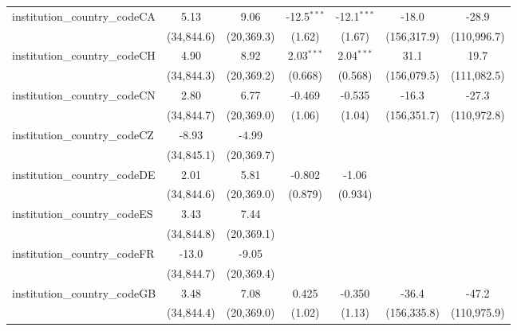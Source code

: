 \begin{tabular}{lcccccc}
   institution\_country\_codeCA          & 5.13         & 9.06         & -12.5$^{***}$ & -12.1$^{***}$ & -18.0       & -28.9\\   
                                         & (34,844.6)   & (20,369.3)   & (1.62)        & (1.67)        & (156,317.9) & (110,996.7)\\   
   institution\_country\_codeCH          & 4.90         & 8.92         & 2.03$^{***}$  & 2.04$^{***}$  & 31.1        & 19.7\\   
                                         & (34,844.3)   & (20,369.2)   & (0.668)       & (0.568)       & (156,079.5) & (111,082.5)\\   
   institution\_country\_codeCN          & 2.80         & 6.77         & -0.469        & -0.535        & -16.3       & -27.3\\   
                                         & (34,844.7)   & (20,369.0)   & (1.06)        & (1.04)        & (156,351.7) & (110,972.8)\\   
   institution\_country\_codeCZ          & -8.93        & -4.99        &               &               &             &   \\   
                                         & (34,845.1)   & (20,369.7)   &               &               &             &   \\   
   institution\_country\_codeDE          & 2.01         & 5.81         & -0.802        & -1.06         &             &   \\   
                                         & (34,844.6)   & (20,369.0)   & (0.879)       & (0.934)       &             &   \\   
   institution\_country\_codeES          & 3.43         & 7.44         &               &               &             &   \\   
                                         & (34,844.8)   & (20,369.1)   &               &               &             &   \\   
   institution\_country\_codeFR          & -13.0        & -9.05        &               &               &             &   \\   
                                         & (34,844.7)   & (20,369.4)   &               &               &             &   \\   
   institution\_country\_codeGB          & 3.48         & 7.08         & 0.425         & -0.350        & -36.4       & -47.2\\   
                                         & (34,844.4)   & (20,369.0)   & (1.02)        & (1.13)        & (156,335.8) & (110,975.9)\\   

\end{tabular}
